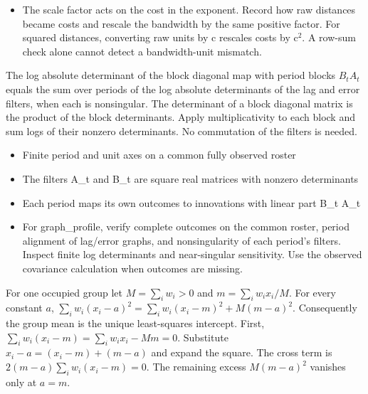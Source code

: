 \expandafter\def\csname statadic@diagnostics@STATADIC-DIFFUSION-002\endcsname{\begin{itemize}
\item The scale factor acts on the cost in the exponent. Record how raw distances became costs and rescale the bandwidth by the same positive factor. For squared distances, converting raw units by c rescales costs by c\ensuremath{{}^2}. A row-sum check alone cannot detect a bandwidth-unit mismatch.
\end{itemize}}
\expandafter\def\csname statadic@statement@STATADIC-SPATIAL-001\endcsname{The log absolute determinant of the block diagonal map
  with period blocks $B_t A_t$ equals the sum over periods of the log absolute
  determinants of the lag and error filters, when each is nonsingular.}
\expandafter\def\csname statadic@proof@STATADIC-SPATIAL-001\endcsname{The determinant of a block diagonal matrix is the product of
  the block determinants. Apply multiplicativity to each block and sum logs
  of their nonzero determinants. No commutation of the filters is needed.}
\expandafter\def\csname statadic@assumptions@STATADIC-SPATIAL-001\endcsname{\begin{itemize}
\item Finite period and unit axes on a common fully observed roster
\item The filters A\_t and B\_t are square real matrices with nonzero determinants
\item Each period maps its own outcomes to innovations with linear part B\_t A\_t
\end{itemize}}
\expandafter\def\csname statadic@diagnostics@STATADIC-SPATIAL-001\endcsname{\begin{itemize}
\item For graph\_profile, verify complete outcomes on the common roster, period alignment of lag/error graphs, and nonsingularity of each period’s filters. Inspect finite log determinants and near-singular sensitivity. Use the observed covariance calculation when outcomes are missing.
\end{itemize}}
\expandafter\def\csname statadic@statement@STATADIC-PANEL-001\endcsname{For one occupied group let $M=\sum_i w_i>0$ and
  $m=\sum_i w_i x_i/M$. For every constant $a$,
  $\sum_i w_i(x_i-a)^2=\sum_i w_i(x_i-m)^2+M(m-a)^2$.
  Consequently the group mean is the unique least-squares intercept.}
\expandafter\def\csname statadic@proof@STATADIC-PANEL-001\endcsname{First, $\sum_i w_i(x_i-m)=\sum_i w_i x_i-Mm=0$.
  Substitute $x_i-a=(x_i-m)+(m-a)$ and expand the square.
  The cross term is $2(m-a)\sum_i w_i(x_i-m)=0$.
  The remaining excess $M(m-a)^2$ vanishes only at $a=m$.}

